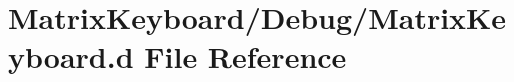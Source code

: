 \hypertarget{_matrix_keyboard_8d}{}\section{Matrix\+Keyboard/\+Debug/\+Matrix\+Keyboard.d File Reference}
\label{_matrix_keyboard_8d}
